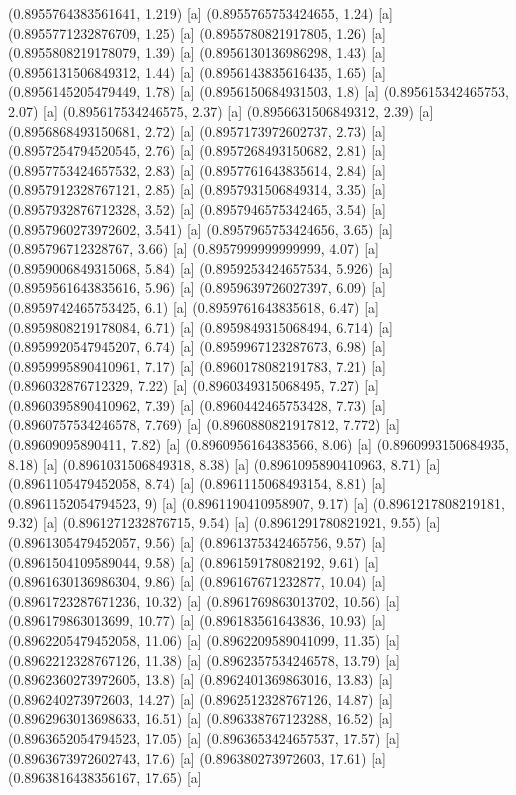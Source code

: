{{{(0.8955764383561641, 1.219) [a] 
(0.8955765753424655, 1.24) [a] 
(0.8955771232876709, 1.25) [a] 
(0.8955780821917805, 1.26) [a] 
(0.8955808219178079, 1.39) [a] 
(0.8956130136986298, 1.43) [a] 
(0.8956131506849312, 1.44) [a] 
(0.8956143835616435, 1.65) [a] 
(0.8956145205479449, 1.78) [a] 
(0.8956150684931503, 1.8) [a] 
(0.895615342465753, 2.07) [a] 
(0.895617534246575, 2.37) [a] 
(0.8956631506849312, 2.39) [a] 
(0.8956868493150681, 2.72) [a] 
(0.8957173972602737, 2.73) [a] 
(0.8957254794520545, 2.76) [a] 
(0.8957268493150682, 2.81) [a] 
(0.8957753424657532, 2.83) [a] 
(0.8957761643835614, 2.84) [a] 
(0.8957912328767121, 2.85) [a] 
(0.8957931506849314, 3.35) [a] 
(0.8957932876712328, 3.52) [a] 
(0.8957946575342465, 3.54) [a] 
(0.8957960273972602, 3.541) [a] 
(0.8957965753424656, 3.65) [a] 
(0.895796712328767, 3.66) [a] 
(0.8957999999999999, 4.07) [a] 
(0.8959006849315068, 5.84) [a] 
(0.8959253424657534, 5.926) [a] 
(0.8959561643835616, 5.96) [a] 
(0.8959639726027397, 6.09) [a] 
(0.8959742465753425, 6.1) [a] 
(0.8959761643835618, 6.47) [a] 
(0.8959808219178084, 6.71) [a] 
(0.8959849315068494, 6.714) [a] 
(0.8959920547945207, 6.74) [a] 
(0.8959967123287673, 6.98) [a] 
(0.8959995890410961, 7.17) [a] 
(0.8960178082191783, 7.21) [a] 
(0.896032876712329, 7.22) [a] 
(0.8960349315068495, 7.27) [a] 
(0.8960395890410962, 7.39) [a] 
(0.8960442465753428, 7.73) [a] 
(0.8960757534246578, 7.769) [a] 
(0.8960880821917812, 7.772) [a] 
(0.89609095890411, 7.82) [a] 
(0.8960956164383566, 8.06) [a] 
(0.8960993150684935, 8.18) [a] 
(0.8961031506849318, 8.38) [a] 
(0.8961095890410963, 8.71) [a] 
(0.8961105479452058, 8.74) [a] 
(0.8961115068493154, 8.81) [a] 
(0.8961152054794523, 9) [a] 
(0.8961190410958907, 9.17) [a] 
(0.8961217808219181, 9.32) [a] 
(0.8961271232876715, 9.54) [a] 
(0.8961291780821921, 9.55) [a] 
(0.8961305479452057, 9.56) [a] 
(0.8961375342465756, 9.57) [a] 
(0.8961504109589044, 9.58) [a] 
(0.896159178082192, 9.61) [a] 
(0.8961630136986304, 9.86) [a] 
(0.896167671232877, 10.04) [a] 
(0.8961723287671236, 10.32) [a] 
(0.8961769863013702, 10.56) [a] 
(0.896179863013699, 10.77) [a] 
(0.896183561643836, 10.93) [a] 
(0.8962205479452058, 11.06) [a] 
(0.8962209589041099, 11.35) [a] 
(0.8962212328767126, 11.38) [a] 
(0.8962357534246578, 13.79) [a] 
(0.8962360273972605, 13.8) [a] 
(0.8962401369863016, 13.83) [a] 
(0.896240273972603, 14.27) [a] 
(0.8962512328767126, 14.87) [a] 
(0.8962963013698633, 16.51) [a] 
(0.896338767123288, 16.52) [a] 
(0.8963652054794523, 17.05) [a] 
(0.8963653424657537, 17.57) [a] 
(0.8963673972602743, 17.6) [a] 
(0.896380273972603, 17.61) [a] 
(0.8963816438356167, 17.65) [a] 
}}}
